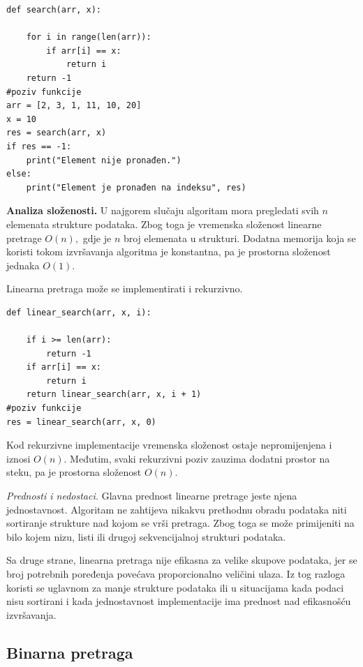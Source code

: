 \begin{verbatim}
def search(arr, x):

    for i in range(len(arr)):
        if arr[i] == x:
            return i
    return -1
#poziv funkcije
arr = [2, 3, 1, 11, 10, 20]
x = 10
res = search(arr, x)
if res == -1:
    print("Element nije pronađen.")
else:
    print("Element je pronađen na indeksu", res)
\end{verbatim}

\textbf{Analiza složenosti.} U najgorem slučaju algoritam mora pregledati svih $n$ elemenata strukture podataka. Zbog toga je vremenska složenost linearne pretrage $O(n),$  gdje je $n$ broj elemenata u strukturi. Dodatna memorija koja se koristi tokom izvršavanja algoritma je konstantna, pa je prostorna složenost jednaka $O(1).$

\vspace{0.3cm}

Linearna pretraga može se implementirati i rekurzivno.

\begin{verbatim}
def linear_search(arr, x, i):

    if i >= len(arr):
        return -1
    if arr[i] == x:
        return i    
    return linear_search(arr, x, i + 1)
#poziv funkcije
res = linear_search(arr, x, 0)
\end{verbatim}

Kod rekurzivne implementacije vremenska složenost ostaje nepromijenjena i iznosi $O(n)$. Međutim, svaki rekurzivni poziv zauzima dodatni prostor na steku, pa je prostorna složenost $O(n).$

\textit{Prednosti i nedostaci.}  Glavna prednost linearne pretrage jeste njena jednostavnost. Algoritam ne zahtijeva nikakvu prethodnu obradu podataka niti sortiranje strukture nad kojom se vrši pretraga. Zbog toga se može primijeniti na bilo kojem nizu, listi ili drugoj sekvencijalnoj strukturi podataka.

Sa druge strane, linearna pretraga nije efikasna za velike skupove podataka, jer se broj potrebnih poređenja povećava proporcionalno veličini ulaza. Iz tog razloga koristi se uglavnom za manje strukture podataka ili u situacijama kada podaci nisu sortirani i kada jednostavnost implementacije ima prednost nad efikasnošću izvršavanja.

\subsection{Binarna pretraga}

